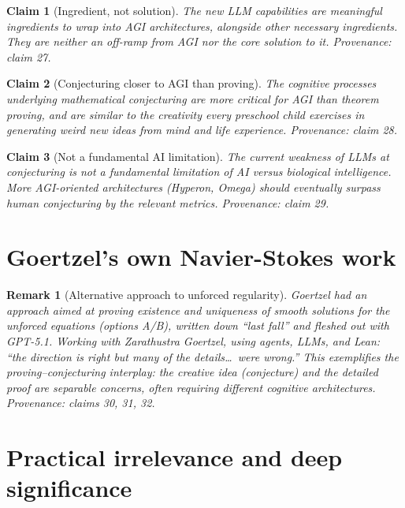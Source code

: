 \documentclass[11pt]{article}
\newtheorem{claim}{Claim}
\newtheorem{remark}{Remark}
\begin{document}
\begin{claim}[Ingredient, not solution]\label{cl:ingredient}
The new LLM capabilities are meaningful ingredients to wrap into AGI
architectures, alongside other necessary ingredients.  They are neither
an off-ramp from AGI nor the core solution to it.
\emph{Provenance: claim 27.}
\end{claim}

\begin{claim}[Conjecturing closer to AGI than proving]\label{cl:conjagi}
The cognitive processes underlying mathematical conjecturing are more
critical for AGI than theorem proving, and are similar to the creativity
every preschool child exercises in generating weird new ideas from mind
and life experience.
\emph{Provenance: claim 28.}
\end{claim}

\begin{claim}[Not a fundamental AI limitation]\label{cl:notfund}
The current weakness of LLMs at conjecturing is not a fundamental limitation
of AI versus biological intelligence.  More AGI-oriented architectures
(Hyperon, Omega) should eventually surpass human conjecturing by the
relevant metrics.
\emph{Provenance: claim 29.}
\end{claim}


\section{Goertzel's own Navier-Stokes work}

\begin{remark}[Alternative approach to unforced regularity]
Goertzel had an approach aimed at proving existence and uniqueness of smooth
solutions for the \emph{unforced} equations (options A/B), written down
``last fall'' and fleshed out with GPT-5.1.  Working with Zarathustra
Goertzel, using agents, LLMs, and Lean: ``the direction is right but many
of the details\ldots\ were wrong.''  This exemplifies the proving--conjecturing
interplay: the creative \emph{idea} (conjecture) and the detailed
\emph{proof} are separable concerns, often requiring different cognitive
architectures.
\emph{Provenance: claims 30, 31, 32.}
\end{remark}


\section{Practical irrelevance and deep significance}
\end{document}
